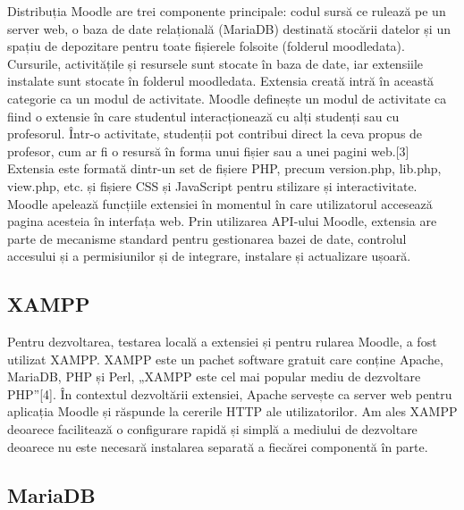 Distribuția Moodle are trei componente principale: codul sursă ce rulează pe un server web, o baza de date relațională (MariaDB) destinată stocării datelor și un spațiu de depozitare pentru
toate fișierele folsoite (folderul moodledata). Cursurile, activitățile și resursele sunt stocate în baza de date, iar extensiile instalate sunt stocate în folderul moodledata. Extensia 
creată intră în această categorie ca un modul de activitate. Moodle definește un modul de activitate ca fiind o extensie în care studentul interacționează cu alți studenți sau cu 
profesorul. Într-o activitate, studenții pot contribui direct la ceva propus de profesor, cum ar fi o resursă în forma unui fișier sau a unei pagini web.[3] Extensia este formată dintr-un
set de fișiere PHP, precum version.php, lib.php, view.php,  etc. și fișiere CSS și JavaScript pentru stilizare și interactivitate. Moodle apelează funcțiile extensiei în momentul în care
utilizatorul accesează pagina acesteia în interfața web. Prin utilizarea API-ului Moodle, extensia are parte de mecanisme standard pentru gestionarea bazei de date, controlul accesului
și a permisiunilor și de integrare, instalare și actualizare ușoară.

\subsection{XAMPP}

Pentru dezvoltarea, testarea locală a extensiei și pentru rularea Moodle, a fost utilizat XAMPP. XAMPP este un pachet software gratuit care conține Apache, MariaDB, PHP și 
Perl, „XAMPP este cel mai popular mediu de dezvoltare PHP”[4]. În contextul dezvoltării extensiei, Apache servește ca server web pentru aplicația Moodle și răspunde la cererile HTTP ale
utilizatorilor. Am ales XAMPP deoarece facilitează o configurare rapidă și simplă a mediului de dezvoltare deoarece nu este necesară instalarea separată a fiecărei componentă în parte.

\subsection{MariaDB}

